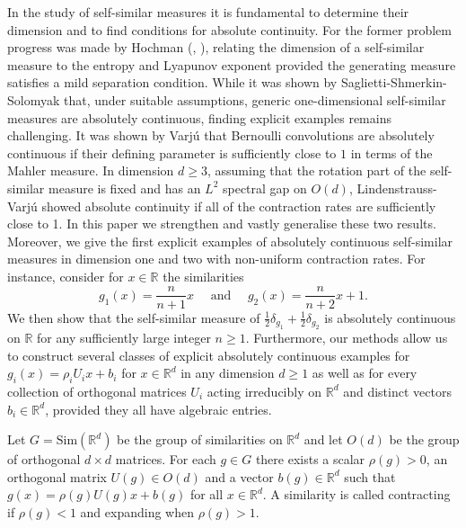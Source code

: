\documentclass[10pt, english,oneside,reqno]{amsart}
\theoremstyle{plain}
\theoremstyle{remark}
\numberwithin{equation}{section}
\numberwithin{figure}{section}
\newcommand{\R}{\mathbb{R}}
\begin{document}
    In the study of self-similar measures it is fundamental to determine their dimension and to find conditions for absolute continuity. For the former problem progress was made by Hochman (\cite{Hochman2014}, \cite{Hochman2017}), relating the dimension of a self-similar measure to the entropy and Lyapunov exponent provided the generating measure satisfies a mild separation condition. While it was shown by Saglietti-Shmerkin-Solomyak \cite{SagliettiShmerkinSolomyak2018} that, under suitable assumptions, generic one-dimensional self-similar measures are absolutely continuous, finding explicit examples remains challenging. It was shown by Varjú \cite{Varju2019} that Bernoulli convolutions are absolutely continuous if their defining parameter is sufficiently close to $1$ in terms of the Mahler measure. In dimension $d\geq 3$, assuming that the rotation part of the self-similar measure is fixed and has an $L^2$ spectral gap on $O(d)$, Lindenstrauss-Varjú \cite{LindenstraussVarju206} showed absolute continuity if all of the contraction rates are sufficiently close to 1. In this paper we strengthen and vastly generalise these two results. Moreover, we give the first explicit examples of absolutely continuous self-similar measures in dimension one and two with non-uniform contraction rates. For instance, consider for $x\in \R$ the similarities 
    \begin{equation}\label{FirstInhomExample}
        g_1(x) = \frac{n}{n + 1}x  \quad \text{ and }   \quad g_2(x) = \frac{n}{n + 2}x + 1.
    \end{equation}
    We then show that the self-similar measure of $\frac{1}{2}\delta_{g_1} + \frac{1}{2}\delta_{g_2}$ is absolutely continuous on $\R$ for any sufficiently large integer $n \geq 1$. Furthermore, our methods allow us to construct several classes of explicit absolutely continuous examples for $g_i(x) = \rho_i U_i x + b_i$ for $x\in \R^d$ in any dimension $d\geq 1$ as well as for every collection of orthogonal matrices $U_i$ acting irreducibly on $\R^d$ and distinct vectors $b_i \in \R^d$, provided they all have algebraic entries. 

    Let $G = \mathrm{Sim}(\R^d)$ be the group of similarities on $\R^d$ and let $O(d)$ be the group of orthogonal $d\times d$ matrices. For each $g \in G$ there exists  a scalar $\rho(g) >  0$, an orthogonal matrix $U(g) \in O(d)$ and a vector $b(g) \in \R^d$ such that $g(x) = \rho(g)U(g)x + b(g)$ for all $x \in \R^d$. A similarity is called contracting if $\rho(g) < 1$ and expanding when $\rho(g) > 1$. 
\end{document}
